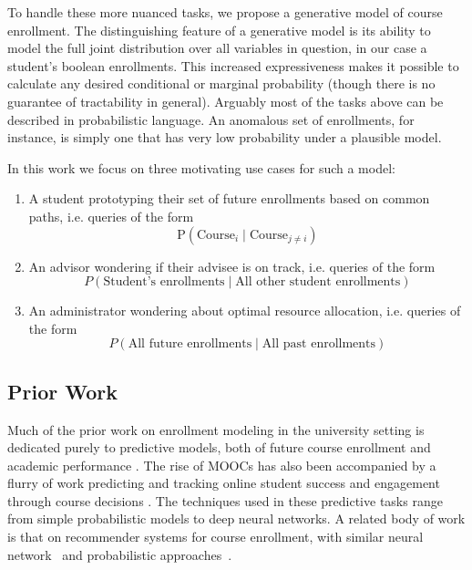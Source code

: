 \documentclass{edm_template}
\begin{document}
To handle these more nuanced tasks, we propose a generative model of course enrollment. The distinguishing feature of a generative model is its ability to model the full joint distribution over all variables in question, in our case a student's boolean enrollments. This increased expressiveness makes it possible to calculate any desired conditional or marginal probability (though there is no guarantee of tractability in general). Arguably most of the tasks above can be described in probabilistic language. An anomalous set of enrollments, for instance, is simply one that has very low probability under a plausible model.

In this work we focus on three motivating use cases for such a model:
\begin{enumerate}[noitemsep,topsep=0pt]
	\item A student prototyping their set of future enrollments based on common paths, i.e. queries of the form
	$$\text{P}(\text{Course}_i \mid \text{Course}_{j \neq i})$$ 
	\item An advisor wondering if their advisee is on track, i.e. queries of the form
	$$P(\text{Student's enrollments} \mid \text{All other student enrollments})$$
	\item An administrator wondering about optimal resource allocation, i.e. queries of the form
	$$P(\text{All future enrollments} \mid \text{All past enrollments})$$
\end{enumerate}

\subsection{Prior Work}

Much of the prior work on enrollment modeling in the university setting is dedicated purely to predictive models, both of future course enrollment \cite{kardan2013prediction}\cite{nandeshwar2009enrollment}\cite{song1993new} and academic performance \cite{kovacic2010early}\cite{hlosta2017ouroboros}. The rise of MOOCs has also been accompanied by a flurry of work predicting and tracking online student success and engagement through course decisions \cite{balakrishnan2013predicting}\cite{Gardner2018StudentSP}\cite{AlShabandar2018TheAO}. The techniques used in these predictive tasks range from simple probabilistic models to deep neural networks. A related body of work is that on recommender systems for course enrollment, with similar neural network~\cite{Jiang2018GoalbasedCR} and probabilistic approaches~\cite{Khorasani2016AMC}. 
\end{document}
